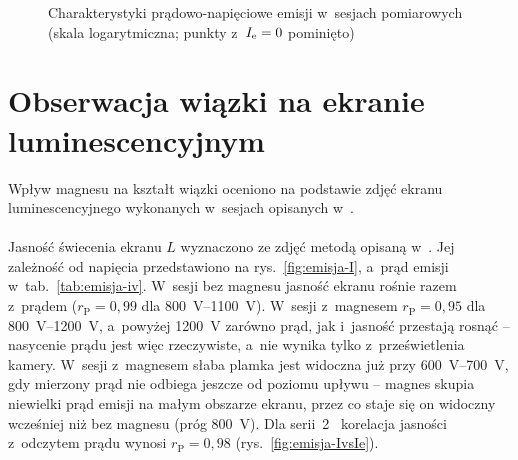 \begin{figure}[htbp]
  \centering
  \caption{Charakterystyki prądowo-napięciowe emisji w~sesjach pomiarowych
    (skala logarytmiczna; punkty z~$I_\mathrm{e}=0$ pominięto)}
  \label{fig:emisja-iv}
\end{figure}


\section{Obserwacja wiązki na ekranie luminescencyjnym}
\label{sec:emisja-ekran}

Wpływ magnesu na kształt wiązki oceniono na podstawie zdjęć ekranu
luminescencyjnego wykonanych w~sesjach opisanych w~.

\paragraph{}

Jasność świecenia ekranu $L$ wyznaczono ze zdjęć metodą opisaną
w~. Jej zależność od napięcia przedstawiono
na rys.~\ref{fig:emisja-I}, a~prąd emisji w~tab.~\ref{tab:emisja-iv}. W~sesji bez magnesu jasność ekranu
rośnie razem z~prądem ($r_\mathrm{P}=0{,}99$ dla \SIrange{800}{1100}{V}).
W~sesji z~magnesem $r_\mathrm{P}=0{,}95$ dla \SIrange{800}{1200}{V}, a~powyżej
\SI{1200}{V} zarówno prąd, jak i~jasność przestają rosnąć -- nasycenie
prądu jest więc rzeczywiste, a~nie wynika tylko z~prześwietlenia
kamery. W~sesji z~magnesem słaba plamka jest widoczna już
przy \SIrange{600}{700}{V}, gdy mierzony prąd nie odbiega jeszcze od
poziomu upływu -- magnes skupia niewielki prąd emisji na małym
obszarze ekranu, przez co staje się on widoczny wcześniej niż bez
magnesu (próg \SI{800}{V}). Dla serii~2 \sesjaM\ korelacja jasności
z~odczytem prądu wynosi $r_\mathrm{P}=0{,}98$ (rys.~\ref{fig:emisja-IvsIe}).

